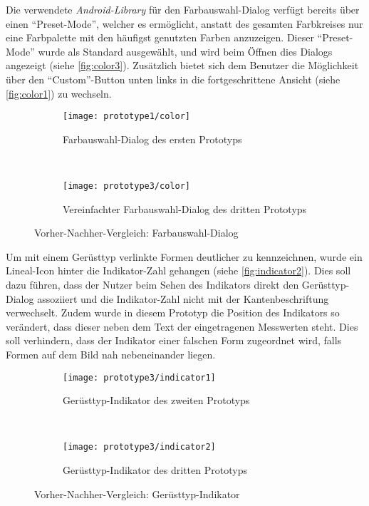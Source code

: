 Die verwendete \emph{Android-Library} für den Farbauswahl-Dialog verfügt bereits über einen ``Preset-Mode'', welcher es ermöglicht, anstatt des gesamten Farbkreises nur eine Farbpalette mit den häufigst genutzten Farben anzuzeigen.
Dieser ``Preset-Mode'' wurde als Standard ausgewählt, und wird beim Öffnen dies Dialogs angezeigt (siehe \autoref{fig:color3}).
Zusätzlich bietet sich dem Benutzer die Möglichkeit über den ``Custom''-Button unten links in die fortgeschrittene Ansicht (siehe \autoref{fig:color1}) zu wechseln. \\

\begin{figure}[h]
  \begin{subfigure}[t]{0.4\textwidth}
    \centering
    \texttt{[image: prototype1/color]}
    \caption{Farbauswahl-Dialog des ersten Prototyps}
    \label{fig:color1}
  \end{subfigure}
  ~
  \begin{subfigure}[t]{0.4\textwidth}
    \centering
    \texttt{[image: prototype3/color]}
    \caption{Vereinfachter Farbauswahl-Dialog des dritten Prototyps}
    \label{fig:color3}
  \end{subfigure}
  \centering
  \caption{Vorher-Nachher-Vergleich: Farbauswahl-Dialog}
\end{figure}

Um mit einem Gerüsttyp verlinkte Formen deutlicher zu kennzeichnen, wurde ein Lineal-Icon hinter die Indikator-Zahl gehangen (siehe \autoref{fig:indicator2}).
Dies soll dazu führen, dass der Nutzer beim Sehen des Indikators direkt den Gerüsttyp-Dialog assoziiert und die Indikator-Zahl nicht mit der Kantenbeschriftung verwechselt.
Zudem wurde in diesem Prototyp die Position des Indikators so verändert, dass dieser neben dem Text der eingetragenen Messwerten steht.
Dies soll verhindern, dass der Indikator einer falschen Form zugeordnet wird, falls Formen auf dem Bild nah nebeneinander liegen. \\

\begin{figure}[h]
  \begin{subfigure}[t]{0.4\textwidth}
    \centering
    \texttt{[image: prototype3/indicator1]}
    \caption{Gerüsttyp-Indikator des zweiten Prototyps}
    \label{fig:indicator1}
  \end{subfigure}
  ~
  \begin{subfigure}[t]{0.4\textwidth}
    \centering
    \texttt{[image: prototype3/indicator2]}
    \caption{Gerüsttyp-Indikator des dritten Prototyps}
    \label{fig:indicator2}
  \end{subfigure}
  \centering
  \caption{Vorher-Nachher-Vergleich: Gerüsttyp-Indikator}
  \label{fig:indicators}
\end{figure}

